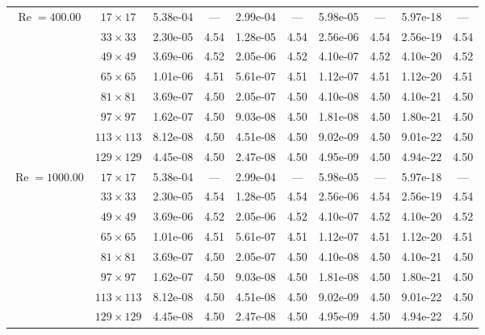 \documentclass[preprint, 12pt]{elsarticle}
\begin{document}
{\begin{center}
\begin{table}[H]
{\begin{tabular*}{\textwidth}{@{\extracolsep\fill}cccccccccc@{}}
    \hline
    \multirow{7}{*}{$\operatorname{Re}=400.00$} & $17\times 17$ & 5.38e-04 & --- & 2.99e-04 & --- & 5.98e-05 & --- & 5.97e-18 & --- \\
    & $33\times 33$ & 2.30e-05 & 4.54 & 1.28e-05 & 4.54 & 2.56e-06 & 4.54 & 2.56e-19 & 4.54 \\
    & $49\times 49$ & 3.69e-06 & 4.52 & 2.05e-06 & 4.52 & 4.10e-07 & 4.52 & 4.10e-20 & 4.52 \\
    \multirow{3}{*}{$\operatorname{Wi}=10$} & $65\times 65$ & 1.01e-06 & 4.51 & 5.61e-07 & 4.51 & 1.12e-07 & 4.51 & 1.12e-20 & 4.51 \\
    & $81\times 81$ & 3.69e-07 & 4.50 & 2.05e-07 & 4.50 & 4.10e-08 & 4.50 & 4.10e-21 & 4.50 \\
    & $97\times 97$ & 1.62e-07 & 4.50 & 9.03e-08 & 4.50 & 1.81e-08 & 4.50 & 1.80e-21 & 4.50 \\
    & $113\times 113$ & 8.12e-08 & 4.50 & 4.51e-08 & 4.50 & 9.02e-09 & 4.50 & 9.01e-22 & 4.50 \\
    & $129\times 129$ & 4.45e-08 & 4.50 & 2.47e-08 & 4.50 & 4.95e-09 & 4.50 & 4.94e-22 & 4.50 \\
    \hline
    \multirow{7}{*}{$\operatorname{Re}=1000.00$} & $17\times 17$ & 5.38e-04 & --- & 2.99e-04 & --- & 5.98e-05 & --- & 5.97e-18 & --- \\
    & $33\times 33$ & 2.30e-05 & 4.54 & 1.28e-05 & 4.54 & 2.56e-06 & 4.54 & 2.56e-19 & 4.54 \\
    & $49\times 49$ & 3.69e-06 & 4.52 & 2.05e-06 & 4.52 & 4.10e-07 & 4.52 & 4.10e-20 & 4.52 \\
    \multirow{3}{*}{$\operatorname{Wi}=10$} & $65\times 65$ & 1.01e-06 & 4.51 & 5.61e-07 & 4.51 & 1.12e-07 & 4.51 & 1.12e-20 & 4.51 \\
    & $81\times 81$ & 3.69e-07 & 4.50 & 2.05e-07 & 4.50 & 4.10e-08 & 4.50 & 4.10e-21 & 4.50 \\
    & $97\times 97$ & 1.62e-07 & 4.50 & 9.03e-08 & 4.50 & 1.81e-08 & 4.50 & 1.80e-21 & 4.50 \\
    & $113\times 113$ & 8.12e-08 & 4.50 & 4.51e-08 & 4.50 & 9.02e-09 & 4.50 & 9.01e-22 & 4.50 \\
    & $129\times 129$ & 4.45e-08 & 4.50 & 2.47e-08 & 4.50 & 4.95e-09 & 4.50 & 4.94e-22 & 4.50 \\
    \hline
    \end{tabular*}
}
\end{table}
\end{center}

}
\end{document}
